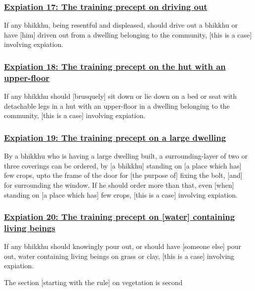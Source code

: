 \subsubsection*{\hyperref[pac17]{Expiation 17: The training precept on driving out}}
\label{exp17}
If any bhikkhu, being resentful and displeased, should drive out a bhikkhu or have [him] driven out from a dwelling belonging to the community, [this is a case] involving expiation.



\subsubsection*{\hyperref[pac18]{Expiation 18: The training precept on the hut with an upper-floor}}
\label{exp18}
If any bhikkhu should [brusquely] sit down or lie down on a bed or seat with detachable legs in a hut with an upper-floor in a dwelling belonging to the community, [this is a case] involving expiation.



\subsubsection*{\hyperref[pac19]{Expiation 19: The training precept on a large dwelling}}
\label{exp19}
By a bhikkhu who is having a large dwelling built, a surrounding-layer of two or three coverings can be ordered, by [a bhikkhu] standing on [a place which has] few crops, upto the frame of the door for [the purpose of] fixing the bolt, [and] for surrounding the window. If he should order more than that, even [when] standing on [a place which has] few crops, [this is a case] involving expiation.



\subsubsection*{\hyperref[pac20]{Expiation 20: The training precept on [water] containing living beings}}
\label{exp20}
If any bhikkhu should knowingly pour out, or should have [someone else] pour out, water containing living beings on grass or clay, [this is a case] involving expiation.

\begin{center}
	The section [starting with the rule] on vegetation is second
\end{center}



